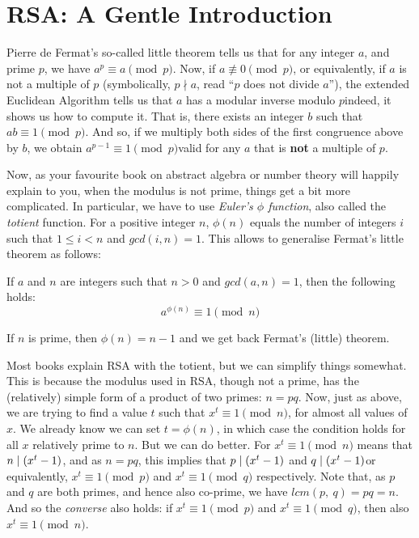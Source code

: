 \section{RSA: A Gentle Introduction}
  \label{sec:rsa_gentle_intro}
  Pierre de Fermat's so-called little theorem tells us that for any integer $a$, and prime $p$, we have $a^p \equiv a \pmod{p}$. Now, if $a\not\equiv 0 \pmod{p}$, or equivalently, if $a$ is not a multiple of $p$ (symbolically, $p\nmid a$, read ``$p$ does not divide $a$''), the extended Euclidean Algorithm tells us that $a$ has a modular inverse modulo $p$\emd indeed, it shows us how to compute it. That is, there exists an integer $b$ such that $ab \equiv 1 \pmod{p}$. And so, if we multiply both sides of the first congruence above by $b$, we obtain $a^{p-1} \equiv 1 \pmod{p}$\emd valid for any $a$ that is \textbf{not} a multiple of $p$.

  Now, as your favourite book on abstract algebra or number theory will happily explain to you, when the modulus is not prime, things get a bit more complicated. In particular, we have to use \emph{Euler's $\phi$ function}, also called the \emph{totient} function. For a positive integer $n$, $\phi(n)$ equals the number of integers $i$ such that $1 \le i < n$ and $gcd(i, n) = 1$. This allows to generalise Fermat's little theorem as follows:
  \begin{theorem}
    \label{thm:euler_theorem}
    If $a$ and $n$ are integers such that $n>0$ and $gcd(a, n) = 1$, then the following holds:
    \begin{equation}
      a^{\phi(n)} \equiv 1 \pmod{n}
    \end{equation}
  \end{theorem}
  \begin{remark}
    \label{rem:totient_for_prime}
    If $n$ is prime, then $\phi(n) = n-1$ and we get back Fermat's (little) theorem.
  \end{remark}

  \medskip

  \noindent Most books explain RSA with the totient, but we can simplify things somewhat. This is because the modulus used in RSA, though not a prime, has the (relatively) simple form of a product of two primes: $n = pq$. Now, just as above, we are trying to find a value $t$ such that $x^t \equiv 1 \pmod{n}$, for almost all values of $x$. We already know we can set $t = \phi(n)$, in which case the condition holds for all $x$ relatively prime to $n$. But we can do better. For $x^t \equiv 1 \pmod{n}$ means that $n\mathrel{|} (x^t-1)$, and as $n = pq$, this implies that $p\mathrel{|} (x^t-1)$ and $q\mathrel{|} (x^t-1)$\emd or equivalently, $x^t \equiv 1 \pmod{p}$ and $x^t \equiv 1 \pmod{q}$ respectively. Note that, as $p$ and $q$ are both primes, and hence also co-prime, we have $lcm(p,\ q) = pq = n$. And so the \emph{converse} also holds: if $x^t \equiv 1 \pmod{p}$ and $x^t \equiv 1 \pmod{q}$, then also $x^t \equiv 1 \pmod{n}$.


